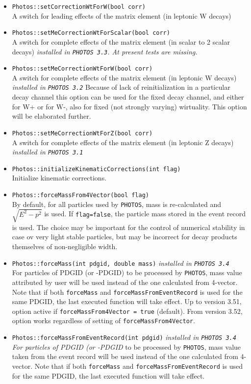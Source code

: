 \documentclass[]{Photos_interface_design}
\begin{document}
\begin{itemize}
  \item {\tt Photos::setCorrectionWtForW(bool corr)} \\
         A switch for leading effects of the matrix element (in leptonic W decays)
  \item {\tt Photos::setMeCorrectionWtForScalar(bool corr)} \\
         A switch for complete effects of the matrix element (in scalar to 2 scalar decays) {\it  installed in {\tt PHOTOS 3.3}. At present tests are missing. }
  \item {\tt Photos::setMeCorrectionWtForW(bool corr)} \\
         A switch for complete effects of the matrix element (in leptonic W decays) {\it  installed in {\tt PHOTOS 3.2} }
        Because of lack of reinitialization in a particular decay channel this option can be used for the fixed 
        decay channel, and either for  W+ or for W-, also for fixed (not strongly varying) wirtuality. 
        This option will be elaborated further.
  \item {\tt Photos::setMeCorrectionWtForZ(bool corr)} \\
         A switch for complete effects of the matrix element (in leptonic Z decays) {\it  installed in {\tt PHOTOS 3.1} }
  \item {\tt Photos::initializeKinematicCorrections(int flag)} \\
        Initialize kinematic corrections.
  \item {\tt Photos::forceMassFrom4Vector(bool flag)}  \\
        By default, for all particles used by {\tt PHOTOS}, 
        mass is re-calculated and $\sqrt{E^2-p^2}$ is used. 
        If {\tt flag=false}, the particle mass stored in the  event record 
        is used. The choice may be important for the control 
        of numerical stability in case ov very light stable particles, but may be incorrect for decay products 
        themselves of non-negligible width.
  \item {\tt Photos::forceMass(int pdgid, double mass)} {\it  installed in {\tt PHOTOS 3.4}} \\
        For particles of PDGID (or -PDGID)  to be processed by {\tt PHOTOS},
        mass value attributed  by user will be used instead of the one calculated
        from 4-vector. Note that if both {\tt forceMass} and {\tt forceMassFromEventRecord} is
        used for the same PDGID, the last executed function will take effect.
        Up to version 3.51, option active if {\tt forceMassFrom4Vector = true} (default).
        From version 3.52, option works regardless of setting of {\tt forceMassFrom4Vector}.
  \item {\tt Photos::forceMassFromEventRecord(int pdgid)} {\it  installed in {\tt PHOTOS 3.4} \\
        For particles of PDGID (or -PDGID} to be  processed by {\tt PHOTOS},
        mass value taken from the event record will be used instead of the one
        calculated from 4-vector. Note that if both {\tt forceMass} and {\tt forceMassFromEventRecord} is
        used for the same PDGID, the last executed function will take effect.


\end{itemize}
\end{document}
